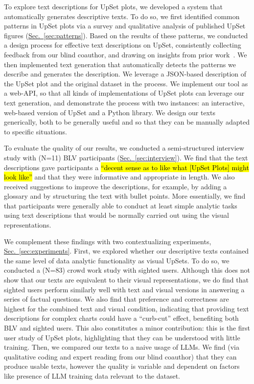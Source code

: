 \documentclass{egpubl}
\newcommand{\secref}[1]{\hyperref[#1]{Sec.~\ref*{#1}}}
\newcommand{\hlc}[2][yellow]{{\colorlet{foo}{#1}\sethlcolor{foo}\hl{#2}}}
\newcommand\qt[1]{\hlc[quoteColor!20]{``#1''}}
\newcommand{\numSurvey}{83}
\newcommand{\numInterviewees}{11}
\begin{document}
To explore text descriptions for UpSet plots, we developed a system that automatically generates descriptive texts.
To do so, we first identified common patterns in UpSet plots via a survey and qualitative analysis of published UpSet figures (\secref{sec:patterns}).
Based on the results of these patterns, we conducted a design process for effective text descriptions on UpSet, consistently collecting feedback from our blind coauthor, and drawing on insights from prior work~\cite{lundgard_accessible_2022}. We then implemented text generation that automatically detects the patterns we describe and generates the description.
We leverage a JSON-based description of the UpSet plot and the original dataset in the process. We implement our tool as a web-API, so that all kinds of implementations of UpSet plots can leverage our text generation, and demonstrate the process with two instances: an interactive, web-based version of UpSet and a Python library.
We design our texts generically, both to be generally useful and so that they can be manually adapted to specific situations.

To evaluate the quality of our results, we conducted a semi-structured interview study with (N=\numInterviewees{}) BLV participants (\secref{sec:interview}).
We find that the text descriptions gave participants a \qt{decent sense as to like what [UpSet Plots] might look like} and that they were informative and appropriate in length. We also received suggestions to improve the descriptions, for example, by adding a glossary and by structuring the text with bullet points.
More essentially, we find that participants were generally able to conduct at least simple analytic tasks using text descriptions that would be normally carried out using the visual representations.

We complement these findings with two contextualizing experiments, \secref{sec:experiments}.
First, we explored whether our descriptive texts contained the same level of data analytic functionality as visual UpSets. To do so, we conducted a (N=\numSurvey) crowd work study with sighted users. Although this does not show that our texts are equivalent to their visual representations, we do find that sighted users perform similarly well with text and visual versions in answering a series of factual questions. We also find that preference and correctness are highest for the combined text and visual condition, indicating that providing text descriptions for complex charts could have a ``curb-cut'' effect, benefiting both BLV and sighted users.
This also constitutes a minor contribution: this is the first user study of UpSet plots, highlighting that they can be understood with little training.
Then, we compared our texts to a naive usage of LLMs.
We find (via qualitative coding and expert reading from our blind coauthor) that they can produce usable texts, however the quality is variable and dependent on factors like presence of LLM training data relevant to the dataset.
\end{document}
